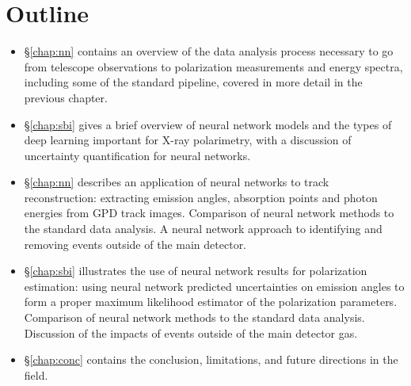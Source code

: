 \section{Outline}
\begin{itemize}
\item \S\ref{chap:nn} contains an overview of the data analysis process necessary to go from telescope observations to polarization measurements and energy spectra, including some of the standard pipeline, covered in more detail in the previous chapter.
\item \S\ref{chap:sbi} gives a brief overview of neural network models and the types of deep learning important for X-ray polarimetry, with a discussion of uncertainty quantification for neural networks.
\item \S\ref{chap:nn} describes an application of neural networks to track reconstruction: extracting emission angles, absorption points and photon energies from GPD track images. Comparison of neural network methods to the standard data analysis.
A neural network approach to identifying and removing events outside of the main detector.
\item \S\ref{chap:sbi} illustrates the use of neural network results for polarization estimation: using neural network predicted uncertainties on emission angles to form a proper maximum likelihood estimator of the polarization parameters.
Comparison of neural network methods to the standard data analysis.
Discussion of the impacts of events outside of the main detector gas.
\item \S\ref{chap:conc} contains the conclusion, limitations, and future directions in the field.
\end{itemize}

